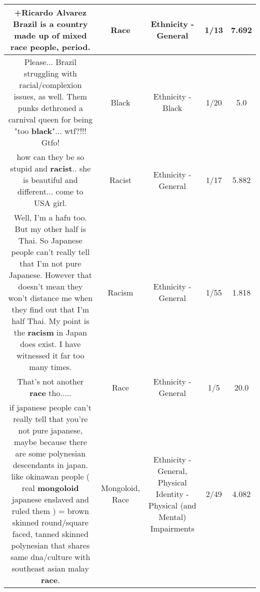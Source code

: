 \documentclass[11pt]{article}
\newlength\mylength
\begin{document}
\begin{center}
\begin{longtable}{|C{.65\mylength}|C{.30\mylength}|C{.12\mylength}|C{.12\mylength}|C{.12\mylength}|}
  \small +Ricardo Alvarez Brazil is a country made up of mixed \textbf{race} people, period.\normalsize   & Race & Ethnicity - General & 1/13 & 7.692 \\  \hline
  \small Please... Brazil struggling with racial/complexion issues, as well. Them punks dethroned a carnival queen for being "too \textbf{black}"... wtf?!!! Gtfo!\normalsize   & Black & Ethnicity - Black & 1/20 & 5.0 \\  \hline
  \small how can they be so stupid and \textbf{racist}.. she is beautiful and different... come to USA girl.\normalsize   & Racist & Ethnicity - General & 1/17 & 5.882 \\  \hline
  \small Well, I'm a hafu too. But my other half is Thai. So Japanese people can't really tell that I'm not pure Japanese. However that doesn't mean they won't distance me when they find out that I'm half Thai. My point is the \textbf{racism} in Japan does exist. I have witnessed it far too many times.\normalsize   & Racism & Ethnicity - General & 1/55 & 1.818 \\  \hline
  \small That's not another \textbf{race} tho.....\normalsize   & Race & Ethnicity - General & 1/5 & 20.0 \\  \hline
  \small if japanese people can't really tell that you're not pure japanese, maybe because there are some polynesian descendants in japan. like okinawan people ( real \textbf{mongoloid} japanese enslaved and ruled them ) = brown skinned round/square faced, tanned skinned polynesian that shares same dna/culture with southeast asian malay \textbf{race}.\normalsize   & Mongoloid, Race & Ethnicity - General, Physical Identity - Physical (and Mental) Impairments & 2/49 & 4.082 \\  \hline

\end{longtable}
\end{center}
\end{document}
